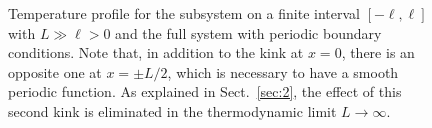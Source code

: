 \documentclass[12pt,a4paper]{article}
\theoremstyle{definition}
\theoremstyle{remark}
\begin{document}
%
\begin{figure}[!htbp]
 
\centering



\caption{Temperature profile for  the subsystem on a finite interval $[-\ell,\ell]$ with $L \gg \ell > 0$ and  the full system with periodic boundary conditions.
Note that, in addition to the kink at $x=0$, there is an opposite one at $x=\pm L/2$, which is necessary to have a smooth periodic function.
As explained in Sect.~\ref{sec:2}, the effect of this second kink is eliminated in the thermodynamic limit $L\to\infty$.}
\label{Fig:Luttinger_profile}
\end{figure}
%
\end{document}
